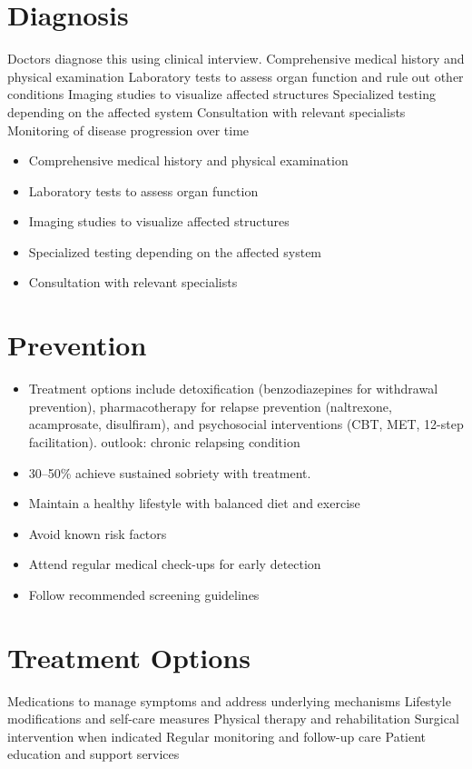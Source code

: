 \section{Diagnosis}
Doctors diagnose this using clinical interview. Comprehensive medical history and physical examination Laboratory tests to assess organ function and rule out other conditions Imaging studies to visualize affected structures Specialized testing depending on the affected system Consultation with relevant specialists Monitoring of disease progression over time

\begin{itemize}[noitemsep]
  \item Comprehensive medical history and physical examination
  \item Laboratory tests to assess organ function
  \item Imaging studies to visualize affected structures
  \item Specialized testing depending on the affected system
  \item Consultation with relevant specialists
\end{itemize}
\section{Prevention}
\begin{itemize}[noitemsep]
  \item Treatment options include detoxification (benzodiazepines for withdrawal prevention), pharmacotherapy for relapse prevention (naltrexone, acamprosate, disulfiram), and psychosocial interventions (CBT, MET, 12-step facilitation). outlook: chronic relapsing condition
  \item 30--50\% achieve sustained sobriety with treatment.
  \item Maintain a healthy lifestyle with balanced diet and exercise
  \item Avoid known risk factors
  \item Attend regular medical check-ups for early detection
  \item Follow recommended screening guidelines
\end{itemize}
\section{Treatment Options}
Medications to manage symptoms and address underlying mechanisms Lifestyle modifications and self-care measures Physical therapy and rehabilitation Surgical intervention when indicated Regular monitoring and follow-up care Patient education and support services

